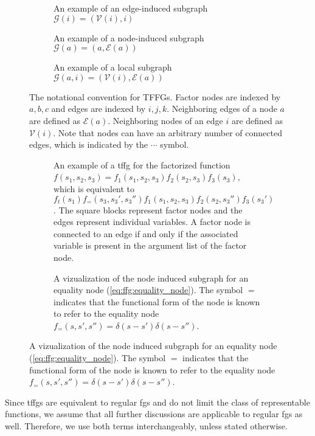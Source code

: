 \begin{figure}
  \centering
  \begin{subfigure}[t]{0.265\textwidth}
    \centering
    \resizebox{\textwidth}{!}{}
    \caption{An example of an edge-induced subgraph $\mathcal{G}(i) = (\mathcal{V}(i), i)$}
    \label{fig:ffg:g_i}
  \end{subfigure}
  \hfill
  \begin{subfigure}[t]{0.285\textwidth}
    \centering
    \resizebox{\textwidth}{!}{}
    \caption{An example of a node-induced subgraph $\mathcal{G}(a) = (a, \mathcal{E}(a))$}
    \label{fig:ffg:g_a}
  \end{subfigure}
  \hfill
  \begin{subfigure}[t]{0.355\textwidth}
    \centering
    \resizebox{\textwidth}{!}{}
    \caption{An example of a local subgraph $\mathcal{G}(a, i) = (\mathcal{V}(i), \mathcal{E}(a))$}
    \label{fig:ffg:g_a_i}
  \end{subfigure}
  \caption{The notational convention for TFFGs.
    Factor nodes are indexed by $a, b, c$ and edges are indexed by $i, j, k$.
    Neighboring edges of a node $a$ are defined as $\mathcal{E}(a)$.
    Neighboring nodes of an edge $i$ are defined as $\mathcal{V}(i)$.
    Note that nodes can have an arbitrary number of connected edges, which is indicated by the
    $\cdots$ symbol.
  }
  \label{fig:ffg:notation}
\end{figure}

\begin{figure}
  \centering
  \begin{subfigure}[t]{0.575\textwidth}
    \centering
    \resizebox{1.0\textwidth}{!}{}
    \caption{An example of a \ac{tffg} for the factorized function $f(s_1, s_2, s_3) = f_1(s_1, s_2, s_3)f_2(s_2, s_3)f_3(s_3)$, which is equivalent to $f_t(s_1)f_{=}(s_3, s_3', s_3'')f_1(s_1, s_2, s_3)f_2(s_2, s_3'')f_3(s_3')$.
      The square blocks represent factor nodes and the edges represent individual variables.
      A factor node is connected to an edge if and only if the associated variable is present in the
      argument list of the factor node.
    }
    \label{fig:ffg:example1_tffg}
  \end{subfigure}
  \hfill
  \begin{subfigure}[t]{0.375\textwidth}
    \centering
    \resizebox{1.0\textwidth}{!}{}
    \caption{A vizualization of the node induced subgraph for an equality node (\ref{eq:ffg:equality_node}).
      The symbol $=$ indicates that the functional form of the node is known to refer to the
      equality node $f_{=}(s, s', s'') = \delta(s - s')\delta(s - s'')$.
    }
    \label{fig:ffg:equality_node}
  \end{subfigure}
  \label{fig:ffg:equality_node_and_tffg_example}
\end{figure}

Since \acp{tffg} are equivalent to regular \acp{fg} and do not limit the class of
representable functions, we assume that all further discussions are applicable to regular
\acp{fg} as well.
Therefore, we use both terms interchangeably, unless stated otherwise.
